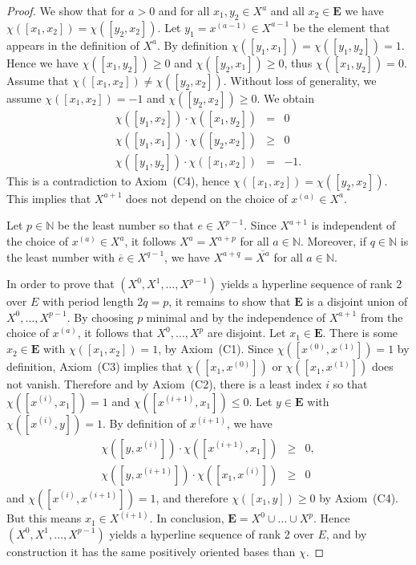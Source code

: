 \documentclass[a4paper]{amsart}
\theoremstyle{definition}
\theoremstyle{remark}
\begin{document}
\begin{proof}
  
  We show that for $a>0$ and for all $x_1,y_2\in X^{a}$ and all
  $x_2\in \mathbf E$ we have $\chi([x_1,x_2]) = \chi([y_2,x_2])$.
%
  Let $y_1=x^{(a-1)}\in X^{a-1}$ be the element that appears in the
  definition of $X^a$. By definition
  $\chi([y_1,x_1])=\chi([y_1,y_2])=1$. Hence we have 
  $\chi([x_1,y_2])\ge 0$ and $\chi([y_2,x_1])\ge 0$, thus
  $\chi([x_1,y_2])=0$. 
%
  Assume that $\chi([x_1,x_2]) \not= \chi([y_2,x_2])$. Without loss of
  generality, we assume $\chi([x_1,x_2])=-1$ and $\chi([y_2,x_2])\ge
  0$.  We obtain
  \begin{eqnarray*}
    \chi([y_1,x_2])\cdot\chi([x_1,y_2]) &=& 0\\
    \chi([y_1,x_1])\cdot\chi([y_2,x_2]) &\ge& 0\\
    \chi([y_1,y_2])\cdot\chi([x_1,x_2]) &=& -1.
  \end{eqnarray*}
  This is a contradiction to Axiom~(C4), hence $\chi([x_1,x_2]) =
  \chi([y_2,x_2])$. This implies that $X^{a+1}$ does not depend on the
  choice of $x^{(a)}\in X^a$.

  
  Let $p\in \mathbb N$ be the least number so that $e\in X^{p-1}$.
  Since $X^{a+1}$ is independent of
  the choice of $x^{(a)}\in X^a$, it follows $X^a=X^{a+p}$ for all $a\in
  \mathbb N$.
%
  Moreover, if $q\in \mathbb N$ is the least number with $\overline
  e\in X^{q-1}$, we have $X^{a+q} = \overline{X^a}$ for all $a\in
  \mathbb N$. 

  In order to prove that $(X^0,X^1,\ldots, X^{p-1})$ yields a hyperline
  sequence of  rank 2 over $E$ with period length $2q=p$, it remains
  to show that $\mathbf E$ is a disjoint union of $X^0,\dots,X^{p-1}$.
%
  By choosing $p$ minimal and by the independence of $X^{a+1}$ from the
  choice of $x^{(a)}$, it follows that $X^0,\dots, X^p$ are disjoint.
%
  Let $x_1\in\mathbf E$. There is some $x_2\in \mathbf E$ with
  $\chi([x_1,x_2])=1$, by Axiom~(C1).
  Since $\chi([x^{(0)},x^{(1)}]) = 1$ by definition, Axiom~(C3) implies
  that $\chi([x_1,x^{(0)}])$ or $\chi([x_1,x^{(1)}])$ does not vanish.
%
  Therefore and by Axiom~(C2), there is a least index $i$ so that
  $\chi([x^{(i)},x_1])=1$ and $\chi([x^{(i+1)},x_1])\le 0$. 
  Let $y\in \mathbf E$ with $\chi([x^{(i)},y])=1$.
  By definition of $x^{(i+1)}$, we have 
  \begin{eqnarray*} 
    \chi([y,x^{(i)}])\cdot \chi([x^{(i+1)},x_1]) &\ge&0, \\
    \chi([y,x^{(i+1)}])\cdot \chi([x_1,x^{(i)}]) &\ge&0
  \end{eqnarray*}
  and $\chi([x^{(i)},x^{(i+1)}]) =1$, and therefore $\chi([x_1,y])\ge 0$
  by Axiom~(C4). But this means $x_1\in X^{(i+1)}$.
  In conclusion, $\mathbf E = X^0\cup\dots\cup X^p$.
%
  Hence $(X^0,X^1,\ldots, X^{p-1})$ yields a hyperline
  sequence  of  rank 2 over $E$, and by construction it has the same
  positively oriented bases than $\chi$. 
  

\end{proof}
\end{document}

